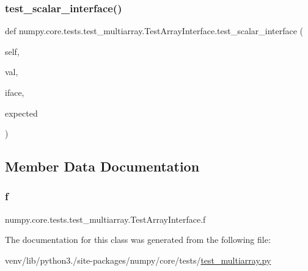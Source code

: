 \subsubsection{\texorpdfstring{test\+\_\+scalar\+\_\+interface()}{test\_scalar\_interface()}}
{\footnotesize\ttfamily def numpy.\+core.\+tests.\+test\+\_\+multiarray.\+Test\+Array\+Interface.\+test\+\_\+scalar\+\_\+interface (\begin{DoxyParamCaption}\item[{}]{self,  }\item[{}]{val,  }\item[{}]{iface,  }\item[{}]{expected }\end{DoxyParamCaption})}



\subsection{Member Data Documentation}
\mbox{\label{classnumpy_1_1core_1_1tests_1_1test__multiarray_1_1TestArrayInterface_aa7fd02f8544c84257c11419d3cccaa1c}} 
\subsubsection{\texorpdfstring{f}{f}}
{\footnotesize\ttfamily numpy.\+core.\+tests.\+test\+\_\+multiarray.\+Test\+Array\+Interface.\+f\hspace{0.3cm}{\ttfamily [static]}}



The documentation for this class was generated from the following file\+:\begin{DoxyCompactItemize}
\item 
venv/lib/python3./site-\/packages/numpy/core/tests/\hyperlink{core_2tests_2test__multiarray_8py}{test\+\_\+multiarray.\+py}\end{DoxyCompactItemize}
